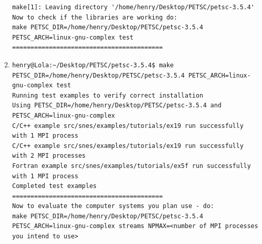 \documentclass{article}
\begin{document}
\begin{enumerate}
\begin{verbatim}
make[1]: Leaving directory '/home/henry/Desktop/PETSC/petsc-3.5.4'
Now to check if the libraries are working do:
make PETSC_DIR=/home/henry/Desktop/PETSC/petsc-3.5.4 PETSC_ARCH=linux-gnu-complex test
=========================================
\end{verbatim}
\normalsize
\item 
\tiny
\begin{verbatim}
henry@Lola:~/Desktop/PETSC/petsc-3.5.4$ make PETSC_DIR=/home/henry/Desktop/PETSC/petsc-3.5.4 PETSC_ARCH=linux-gnu-complex test
Running test examples to verify correct installation
Using PETSC_DIR=/home/henry/Desktop/PETSC/petsc-3.5.4 and PETSC_ARCH=linux-gnu-complex
C/C++ example src/snes/examples/tutorials/ex19 run successfully with 1 MPI process
C/C++ example src/snes/examples/tutorials/ex19 run successfully with 2 MPI processes
Fortran example src/snes/examples/tutorials/ex5f run successfully with 1 MPI process
Completed test examples
=========================================
Now to evaluate the computer systems you plan use - do:
make PETSC_DIR=/home/henry/Desktop/PETSC/petsc-3.5.4 PETSC_ARCH=linux-gnu-complex streams NPMAX=<number of MPI processes you intend to use>


\end{verbatim}
\end{enumerate}
\end{document}
